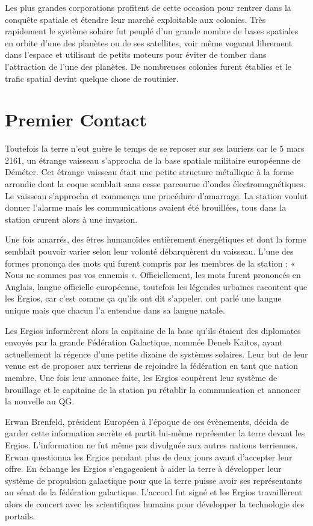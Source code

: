 \begin{multicols}{2}
Les plus grandes corporations profitent de cette occasion pour rentrer dans la conquête spatiale et étendre leur marché exploitable aux colonies. Très rapidement le système solaire fut peuplé d’un grande nombre de bases spatiales en orbite d’une des planètes ou de ses satellites, voir même voguant librement dans l’espace et utilisant de petits moteurs pour éviter de tomber dans l’attraction de l’une des planètes. De nombreuses colonies furent établies et le trafic spatial devint quelque chose de routinier.

\section{Premier Contact}

Toutefois la terre n’eut guère le temps de se reposer sur ses lauriers car le 5 mars 2161, un étrange vaisseau s’approcha de la base spatiale militaire européenne de Déméter. Cet étrange vaisseau était une petite structure métallique à la forme arrondie dont la coque semblait sans cesse parcourue d’ondes électromagnétiques. Le vaisseau s’approcha et commença une procédure d’amarrage. La station voulut donner l’alarme mais les communications avaient été brouillées, tous dans la station crurent alors à une invasion.

Une fois amarrés, des êtres humanoïdes entièrement énergétiques et dont la forme semblait pouvoir varier selon leur volonté débarquèrent du vaisseau. L’une des formes prononça des mots qui furent compris par les membres de la station : « Nous ne sommes pas vos ennemis ».  Officiellement, les mots furent prononcés en Anglais, langue officielle européenne, toutefois les légendes urbaines racontent que les Ergios, car c’est comme ça qu’ils ont dit s’appeler, ont parlé une langue unique mais que chacun l’a entendue dans sa langue natale.

Les Ergios informèrent alors la capitaine de la base qu’ils étaient des diplomates envoyés par la grande Fédération Galactique, nommée Deneb Kaitos, ayant actuellement la régence d’une petite dizaine de systèmes solaires. Leur but de leur venue est de proposer aux terriens de rejoindre la fédération en tant que nation membre. Une fois leur annonce faite, les Ergios coupèrent leur système de brouillage et le capitaine de la station pu rétablir la communication et annoncer la nouvelle au QG.

Erwan Brenfeld, président Européen à l’époque de ces évènements, décida de garder cette information secrète et partit lui-même représenter la terre devant les Ergios. L’information ne fut même pas divulguée aux autres nations terriennes. Erwan questionna les Ergios pendant plus de deux jours avant d’accepter leur offre. En échange les Ergios s’engageaient à aider la terre à développer leur système de propulsion galactique pour que la terre puisse avoir ses représentants au sénat de la fédération galactique. L’accord fut signé et les Ergios travaillèrent alors de concert avec les scientifiques humains pour développer la technologie des portails. 


\end{multicols}
